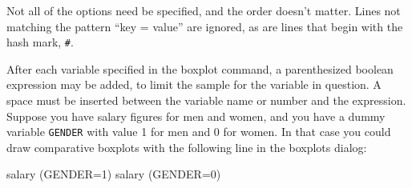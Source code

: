 Not all of the options need be specified, and the order doesn't
matter.  Lines not matching the pattern ``key = value'' are ignored,
as are lines that begin with the hash mark, \verb+#+.

After each variable specified in the boxplot command, a parenthesized
boolean expression may be added, to limit the sample for the variable
in question.  A space must be inserted between the variable name or
number and the expression.  Suppose you have salary figures for men
and women, and you have a dummy variable \verb+GENDER+ with value 1
for men and 0 for women.  In that case you could draw comparative
boxplots with the following line in the boxplots dialog:

\begin{code}
    salary (GENDER=1) salary (GENDER=0)
\end{code}


